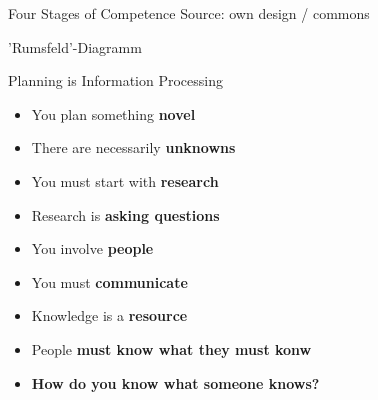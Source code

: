 
\begin{frame}{Four Stages of Competence}
    \vfill
    Source: own design / commons
\end{frame}

\begin{frame}{'Rumsfeld'-Diagramm}
    \par{}
\end{frame}

\begin{frame}{Planning is Information Processing}
    \begin{itemize}
        \item You plan something \textbf{novel}
        \item There are necessarily \textbf{unknowns}
        \item You must start with \textbf{research}
        \item Research is \textbf{asking questions}
        \item You involve \textbf{people}
        \item You must \textbf{communicate}
        \item Knowledge is a \textbf{resource}
        \item People \textbf{must know what they must konw}
        \item \textbf{How do you know what someone knows?}
    \end{itemize}
\end{frame}

